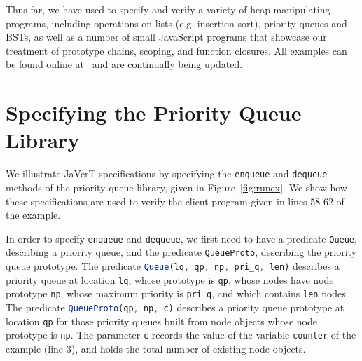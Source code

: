 \documentclass{llncs}
\def\jsinline{\lstinline[language=JavaScript, basicstyle=\small]}
\begin{document}
Thus far, we have used \javert to specify and verify a variety of heap-manipulating programs, including operations 
on lists (e.g. insertion sort), priority queues and BSTs, as well as a number of small
JavaScript programs that showcase our treatment of prototype chains,
scoping, and function closures. All examples can be found online
at~\cite{jsil:url} and are continually being updated. 




\section{Specifying the Priority Queue Library}
We illustrate JaVerT specifications by specifying the
\jsinline|enqueue| and \jsinline|dequeue| methods of the priority
queue library, given in Figure~\ref{fig:runex}.
We show how these specifications are used to verify the
client program given in  lines 58-62 of the example.

In order to specify \jsinline|enqueue| and \jsinline|dequeue|, we
first need to have a predicate \jsinline|Queue|, describing a priority
queue, and the predicate \jsinline|QueueProto|, describing the  priority queue prototype.
The predicate \jsinline|Queue(lq, qp, np, pri_q, len)| describes a priority queue at 
location \jsinline|lq|, whose prototype is \jsinline|qp|, whose nodes
have node  prototype \jsinline|np|, whose maximum  
priority is \jsinline|pri_q|, and which contains \jsinline|len| nodes.  
The predicate \jsinline|QueueProto(qp, np, c)| describes a priority queue prototype at location \jsinline|qp|
for those priority queues built from node objects whose node prototype
is \jsinline|np|.
The parameter \jsinline|c| records the value of the variable
\jsinline|counter| of the example (line 3), and holds the total number of existing node objects.
\end{document}
